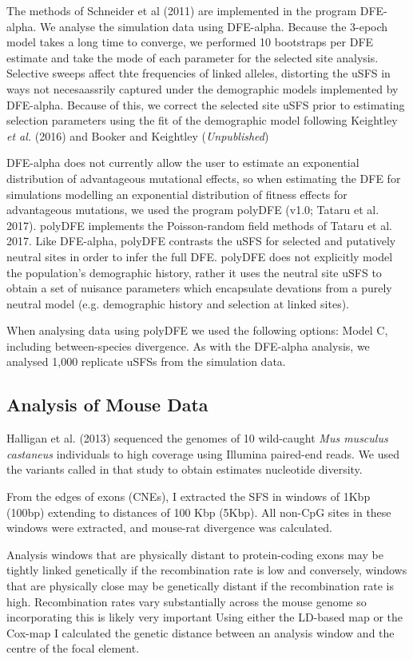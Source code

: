\documentclass[11pt]{article}
\begin{document}
		The methods of Schneider et al (2011) are implemented in the program DFE-alpha. We analyse the simulation data using DFE-alpha. Because the 3-epoch model takes a long time to converge, we performed 10 bootstraps per DFE estimate and take the mode of each parameter for the selected site analysis. Selective sweeps affect thte frequencies of linked alleles, distorting the uSFS in ways not necesaassrily captured under the demographic models implemented by DFE-alpha. Because of this, we correct the selected site uSFS prior to estimating selection parameters using the fit of the demographic model following Keightley \textit{et al.} (2016) and Booker and Keightley (\textit{Unpublished})
			
		DFE-alpha does not currently allow the user to estimate an exponential distribution of advantageous mutational effects, so when estimating the DFE for simulations modelling an exponential distribution of fitness effects for advantageous mutations, we used the program polyDFE (v1.0; Tataru et al. 2017). polyDFE implements the Poisson-random field methods of Tataru et al. 2017. Like DFE-alpha, polyDFE contrasts the uSFS for selected and putatively neutral sites in order to infer the full DFE. polyDFE does not explicitly model the population's demographic history, rather it uses the neutral site uSFS to obtain a set of nuisance parameters which encapsulate devations from a purely neutral model (e.g. demographic history and selection at linked sites).
		
	 When analysing data using polyDFE we used the following options: Model C, including between-species divergence. As with the DFE-alpha analysis, we analysed 1,000 replicate uSFSs from the simulation data.

	\subsection*{Analysis of Mouse Data}

Halligan et al. (2013) sequenced the genomes of 10 wild-caught \emph{Mus musculus castaneus} individuals to high coverage using Illumina paired-end reads. We used the variants called in that study to obtain estimates nucleotide diversity.

	From the edges of exons (CNEs), I extracted the SFS in windows of 1Kbp (100bp) extending to distances of 100 Kbp (5Kbp). All non-CpG sites in these windows were extracted, and mouse-rat divergence was calculated. 
	
	Analysis windows that are physically distant to protein-coding exons may be tightly linked genetically if the recombination rate is low and conversely, windows that are physically close may be genetically distant if the recombination rate is high. Recombination rates vary substantially across the mouse genome so incorporating this is likely very important 
	Using either the LD-based map or the Cox-map I calculated the genetic distance between an analysis window and the centre of the focal element. 
\end{document}
